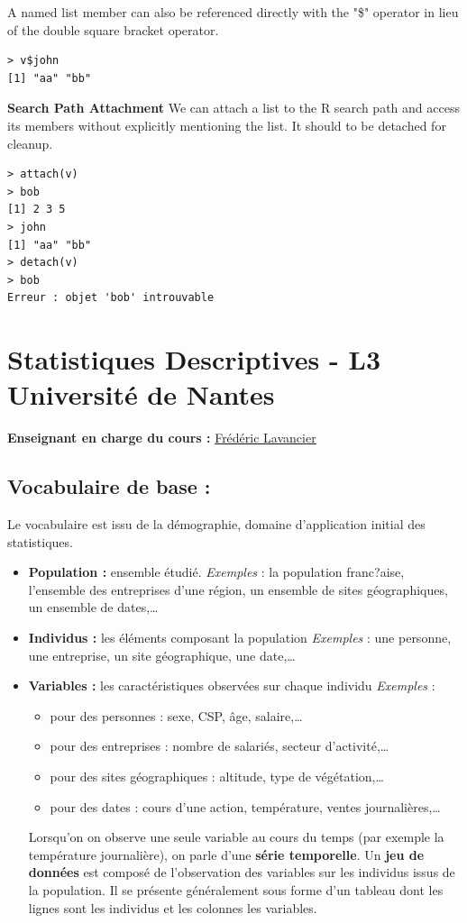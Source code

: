 A named list member can also be referenced directly with the "\$" operator in lieu of the double square bracket operator. 
\begin{lstlisting}[language=html]
> v$john
[1] "aa" "bb"
\end{lstlisting}
\textbf{Search Path Attachment}\newline
We can attach a list to the R search path and access its members without explicitly mentioning the list. It should to be detached for cleanup. 
\begin{lstlisting}[language=html]
> attach(v)
> bob
[1] 2 3 5
> john
[1] "aa" "bb"
> detach(v)
> bob
Erreur : objet 'bob' introuvable
\end{lstlisting}
\newpage

\section{Statistiques Descriptives - L3 Université de Nantes}
\textbf{Enseignant en charge du cours : }\href{http://www.math.sciences.univ-nantes.fr/~lavancie/}{\underline{Frédéric Lavancier}}
\subsection{Vocabulaire de base : }
Le vocabulaire est issu de la démographie, domaine d'application initial des statistiques.\newline
\begin{itemize}
\item \textbf{Population :} ensemble étudié.\newline
\textit{Exemples} : la population franc?aise, l'ensemble des entreprises d'une région, un ensemble de sites géographiques, un ensemble de dates,\dots
\item \textbf{Individus :} les éléments composant la population\newline
\textit{Exemples} : une personne, une entreprise, un site géographique, une date,\dots
\item \textbf{Variables :} les caractéristiques observées sur chaque individu\newline
\textit{Exemples} :
\begin{itemize}
\item pour des personnes : sexe, CSP, âge, salaire,\dots
\item pour des entreprises : nombre de salariés, secteur d'activité,\dots
\item pour des sites géographiques : altitude, type de végétation,\dots
\item pour des dates : cours d'une action, température, ventes journalières,\dots
\end{itemize}
Lorsqu'on on observe une seule variable au cours du temps (par exemple la température journalière), on parle d'une \textbf{série temporelle}.\newline
Un \textbf{jeu de données} est composé de l'observation des variables sur les individus issus de la population. Il se présente généralement sous forme d'un tableau dont les lignes sont les individus et les colonnes les variables.
\end{itemize}

